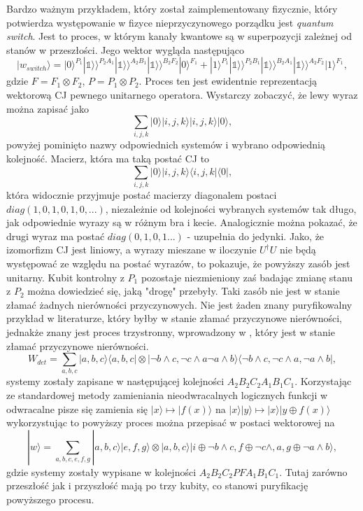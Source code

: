 \documentclass[10pt]{article} %
\newcommand{\Ket}[1]{|#1\rangle}
\newcommand{\Bra}[1]{\langle#1|}
\newcommand{\KKet}[1]{|#1\rangle\rangle}
\newcommand{\I}{\mathbb{1}}
\begin{document}
Bardzo ważnym przykładem, który został zaimplementowany fizycznie, który potwierdza występowanie w fizyce nieprzyczynowego porządku jest \textit{quantum switch}. Jest to proces, w którym kanały kwantowe są w superpozycji zależnej od stanów w przeszłości. Jego wektor wygląda następująco
\begin{equation}
\Ket{w_{switch}} = \Ket{0}^{P_1}\KKet{\I}^{P_2A_1}\KKet{\I}^{A_2B_1}\KKet{\I}^{B_2F_2}\Ket{0}^{F_1}+\Ket{1}^{P_1}\KKet{\I}^{P_2B_1}\KKet{\I}^{B_2A_1}\KKet{\I}^{A_2F_2}\Ket{1}^{F_1},
\end{equation} gdzie $F = F_1 \otimes F_2$, $P = P_1 \otimes P_2$. Proces ten jest ewidentnie reprezentacją wektorową CJ pewnego unitarnego operatora. Wystarczy zobaczyć, że lewy wyraz można zapisać jako
\begin{equation}
\sum_{i,j,k} \Ket{0} \Ket{i,j,k}\Ket{i,j,k}\Ket{0},
\end{equation} powyżej pominięto nazwy odpowiednich systemów i wybrano odpowiednią kolejność.
Macierz, która ma taką postać CJ to
\begin{equation}
\sum_{i,j,k} \Ket{0} \Ket{i,j,k}\Bra{i,j,k}\Bra{0},
\end{equation} która widocznie przyjmuje postać macierzy diagonalem postaci $diag(1,0,1,0,1,0,...)$, niezależnie od kolejności wybranych systemów tak długo, jak odpowiednie wyrazy są w różnym bra i kecie. Analogicznie można pokazać, że drugi wyraz ma postać $diag(0,1,0,1...)$ - uzupełnia do jedynki. Jako, że izomorfizm CJ jest liniowy, a wyrazy mieszane w iloczynie $U^\dag U$ nie będą występować ze względu na postać wyrazów, to pokazuje, że powyższy zasób jest unitarny. Kubit kontrolny z $P_1$ pozostaje niezmieniony zaś badając zmianę stanu z $P_2$ można dowiedzieć się, jaką "drogę" przebyły. Taki zasób nie jest w stanie złamać żadnych nierówności przyczynowych.
Nie jest żaden znany puryfikowalny przykład w literaturze, który byłby w stanie złamać przyczynowe nierówności, jednakże znany jest proces trzystronny, wprowadzony w \cite{logic}, który jest w stanie złamać przyczynowe nierówności. 
\begin{equation}
W_{det} = \sum_{a,b,c} \Ket{a,b,c}\Bra{a,b,c} \otimes \Ket{\neg b \land c, \neg c\land a \neg a\land b} \Bra{\neg b \land c, \neg c\land a ,\neg a\land b},
\end{equation} systemy zostały zapisane w następującej kolejności $A_2B_2C_2A_1B_1C_1$. Korzystając ze standardowej metody zamieniania nieodwracalnych logicznych funkcji w odwracalne pisze się zamienia się
$\Ket{x} \mapsto \Ket{f(x)}$ na $\Ket{x}\Ket{y} \mapsto \Ket{x}\Ket{y \oplus f(x)}$ wykorzystując to powyższy proces można przepisać w postaci wektorowej na
\begin{equation}
\Ket{w} = \sum_{a,b,c,e,f,g} \Ket{a,b,c}\Ket{e,f,g} \otimes \Ket{a,b,c}\Ket{i \oplus \neg b \land c,f \oplus \neg c\land, a , g\oplus \neg a\land b},
\end{equation} gdzie systemy zostały wypisane w kolejności $A_2B_2C_2PFA_1B_1C_1$. Tutaj zarówno przeszłość jak i przyszłość mają po trzy kubity, co stanowi puryfikację powyższego procesu.
\end{document}

